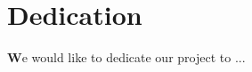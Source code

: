 \section*{Dedication}


\vspace{1cm}
\par \textbf{W}e would like to dedicate our project to ... \\
\\

